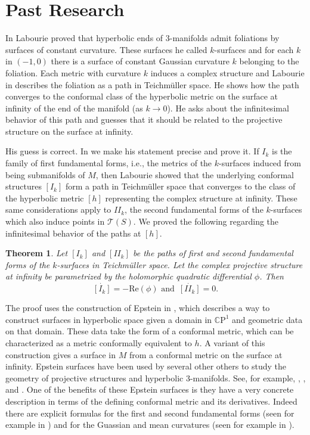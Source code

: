 \documentclass[11pt]{amsart}
\newcommand{\CP}{\mathbb{C}\mathrm{P}}
\newtheorem{thm}{Theorem}[section]
\begin{document}
\section{Past Research}
In \cite{labourie1991} Labourie proved that hyperbolic ends of 3-manifolds admit foliations by surfaces of constant curvature. 
These surfaces he called $k$-surfaces and for each $k$ in $(-1,0)$ there is a surface of constant Gaussian curvature $k$ belonging to the foliation. 
Each metric with curvature $k$ induces a complex structure and Labourie in \cite{labourie1992} describes the foliation as a path in Teichm\"uller space. 
He shows how the path converges to the conformal class of the hyperbolic metric on the surface at infinity of the end of the manifold (as $k \to 0$).
He asks about the infinitesimal behavior of this path and guesses that it should be related to the projective structure on the surface at infinity. 

His guess is correct. 
In \cite{quinn2020} we make his statement precise and prove it. 
If $I_k$ is the family of first fundamental forms, i.e., the metrics of the $k$-surfaces induced from being submanifolds of $M$, then Labourie showed that the underlying conformal structures $[I_k]$ form a path in Teichm\"uller space that converges to the class of the hyperbolic metric $[h]$ representing the complex structure at infinity. 
These same considerations apply to $I\!I_k$, the second fundamental forms of the $k$-surfaces which also induce points in $\mathcal{T}(S)$. 
We proved the following regarding the infinitesimal behavior of the paths at $[h]$.

\begin{thm}
\label{k-surfaces-thm}
Let $[I_k]$ and $[I\!I_k]$ be the paths of first and second fundamental forms of the $k$-surfaces in Teichm\"uller space. 
Let the complex projective structure at infinity be parametrized by the holomorphic quadratic differential $\phi$. 
Then 
\[
\dot{[I_k]} = -\mathrm{Re}(\phi) \text{ and } \, \dot{[I\!I_k]} = 0.
\]
\end{thm}

The proof uses the construction of Epstein in \cite{epstein1984}, which describes a way to construct surfaces in hyperbolic space given a domain in $\CP^1$ and geometric data on that domain. 
These data take the form of a conformal metric, which can be characterized as a metric conformally equivalent to $h$. 
A variant of this construction gives a surface in $M$ from a conformal metric on the surface at infinity. 
Epstein surfaces have been used by several other others to study the geometry of projective structures and hyperbolic 3-manifolds. 
See, for example, \cite{anderson1998}, \cite{bromberg2004}, and \cite{krasnov-schlenker2008}. 
One of the benefits of these Epstein surfaces is they have a very concrete description in terms of the defining conformal metric and its derivatives. 
Indeed there are explicit formulas for the first and second fundamental forms (seen for example in \cite{dumas2017}) and for the Guassian and mean curvatures (seen for example in \cite{quinn2020}). 
\end{document}
